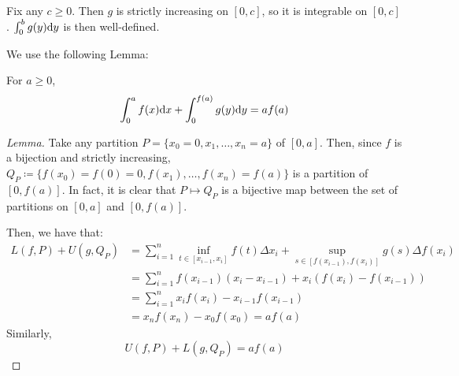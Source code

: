 \documentclass[a4paper, 12pt]{article}
\begin{document}
\begin{solution}
    Fix any $c \geq 0$. Then $g$ is strictly increasing on $[0, c]$, so it is integrable on $[0, c]$. $\int_{0}^{b} g(y) \mathrm{d} y$ is then well-defined.

    We use the following Lemma:
    \begin{psetlemma}
    For $a \geq 0$, \begin{equation*}
    \int_{0}^{a} f(x) \mathrm{d} x + \int_{0}^{f(a)} g(y) \mathrm{d} y = af(a)
    \end{equation*}
    \end{psetlemma}

    \begin{proof} [Lemma]
        Take any partition $P = \{x_0 = 0, x_1, \ldots, x_n = a\}$ of $[0, a]$. Then, since $f$ is a bijection and strictly increasing, $Q_P \coloneqq \{f(x_0) = f(0) = 0, f(x_1), \ldots, f(x_n) = f(a)\}$ is a partition of $[0, f(a)]$. In fact, it is clear that $P \mapsto Q_P$ is a bijective map between the set of partitions on $[0, a]$ and $[0, f(a)]$.

        Then, we have that:
        \begin{align*}
            L(f, P) + U(g, Q_P) &= \sum_{i=1}^{n} \inf_{t \in [x_{i-1}, x_i]} f(t) \Delta x_i + \sup_{s \in [f(x_{i-1}), f(x_i)]} g(s) \Delta f(x_i) \\
            &= \sum_{i=1}^{n} f(x_{i-1}) (x_i - x_{i-1}) + x_i (f(x_i) - f(x_{i-1})) \\
            &= \sum_{i=1}^{n} x_i f(x_i) - x_{i-1} f(x_{i-1}) \\
            &= x_n f(x_n) - x_0 f(x_0) = a f(a)
        \end{align*}
        Similarly, \begin{equation*}
            U(f, P) + L(g, Q_P) = a f(a)
        \end{equation*}


\end{proof}
\end{solution}
\end{document}
